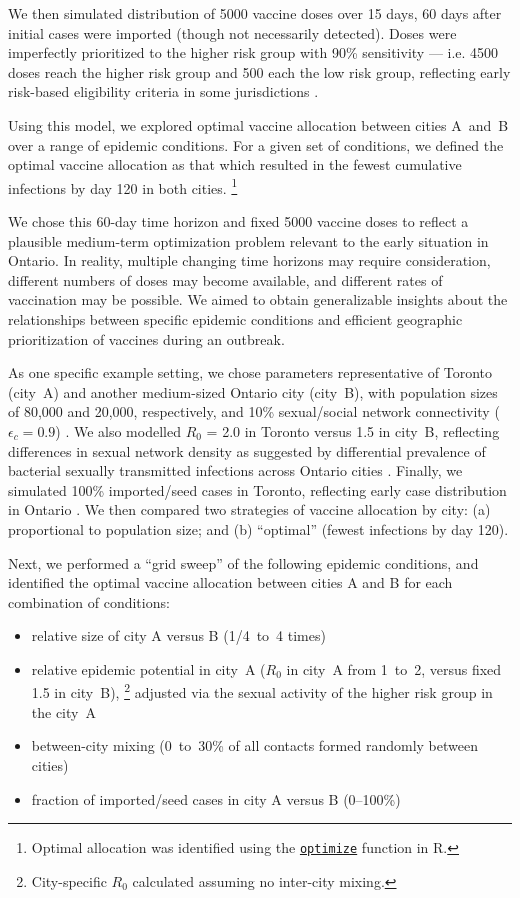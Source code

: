 We then simulated distribution of 5000 vaccine doses over 15 days,
60 days after initial cases were imported (though not necessarily detected).
Doses were imperfectly prioritized to the higher risk group with 90\% sensitivity
--- i.e. 4500 doses reach the higher risk group and 500 each the low risk group,
reflecting early risk-based eligibility criteria in some jurisdictions \cite{TPH2022vax}.
\par
Using this model, we explored optimal vaccine allocation between cities A~and~B
over a range of epidemic conditions.
For a given set of conditions, we defined the optimal vaccine allocation as that which
resulted in the fewest cumulative infections by day 120 in both cities.%
\footnote{Optimal allocation was identified using the
  \href{https://www.rdocumentation.org/link/optimize?package=stats}
  {\texttt{optimize}} function in R.}
\par
We chose this 60-day time horizon and fixed 5000 vaccine doses to reflect
a plausible medium-term optimization problem relevant to the early \MPXV situation in Ontario.
In reality, multiple changing time horizons may require consideration,
different numbers of doses may become available, and
different rates of vaccination may be possible.
We aimed to obtain generalizable insights about the relationships between
specific epidemic conditions and efficient geographic prioritization of vaccines during an outbreak.
\par
As one specific example setting, we chose parameters representative of
Toronto (city~A) and another medium-sized Ontario city (city~B),
with \GBMSM population sizes of 80,000 and 20,000, respectively,
and 10\% sexual/social network connectivity ($\epsilon_c = 0.9$) \cite{Armstrong2020}.
We also modelled $R_0$ = 2.0 in Toronto versus 1.5 in city~B,
reflecting differences in sexual network density as suggested by differential prevalence of
bacterial sexually transmitted infections across Ontario cities \cite{Gesink2014,Hart2021}.
Finally, we simulated 100\% imported/seed cases in Toronto,
reflecting early \MPXV case distribution in Ontario \cite{PHO2022ont}.
We then compared two strategies of vaccine allocation by city:
(a) proportional to population size; and
(b) ``optimal'' (fewest infections by day 120).
\par
\pagebreak %
Next, we performed a ``grid sweep'' of the following epidemic conditions,
and identified the optimal vaccine allocation between cities A and B
for each combination of conditions:
\begin{itemize}
  \item relative size of city A versus B (1/4~to~4 times)
  \item relative epidemic potential in city~A ($R_0$ in city~A from 1~to~2, versus fixed 1.5 in city~B),%
  \footnote{City-specific $R_0$ calculated assuming no inter-city mixing.}
        adjusted via the sexual activity of the higher risk group in the city~A
  \item between-city mixing (0~to~30\% of all contacts formed randomly between cities)
  \item fraction of imported/seed cases in city A versus B (0--100\%)
\end{itemize}
\pagebreak %


